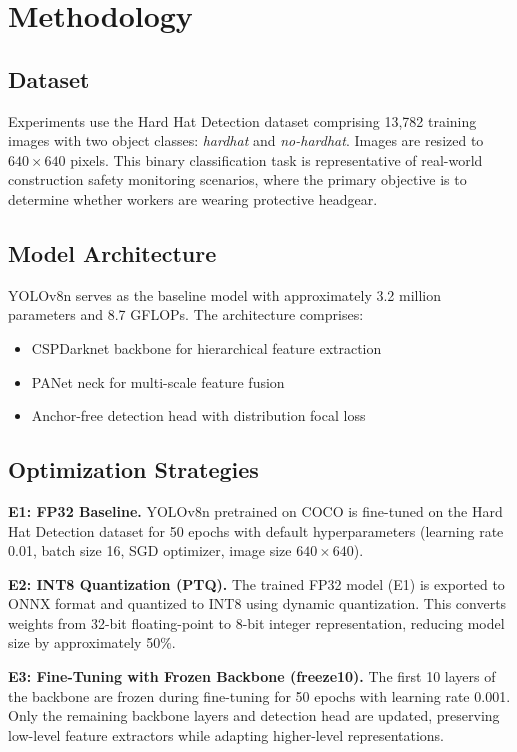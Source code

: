\documentclass[conference,a4paper]{IEEEtran}
\begin{document}
\section{Methodology}

\subsection{Dataset}

Experiments use the Hard Hat Detection dataset comprising 13,782 training images with two object classes: \textit{hardhat} and \textit{no-hardhat}. Images are resized to $640 \times 640$ pixels. This binary classification task is representative of real-world construction safety monitoring scenarios, where the primary objective is to determine whether workers are wearing protective headgear.

\subsection{Model Architecture}

YOLOv8n serves as the baseline model with approximately 3.2 million parameters and 8.7 GFLOPs. The architecture comprises:
\begin{itemize}
    \item CSPDarknet backbone for hierarchical feature extraction
    \item PANet neck for multi-scale feature fusion
    \item Anchor-free detection head with distribution focal loss
\end{itemize}

\subsection{Optimization Strategies}

\textbf{E1: FP32 Baseline.} YOLOv8n pretrained on COCO is fine-tuned on the Hard Hat Detection dataset for 50 epochs with default hyperparameters (learning rate 0.01, batch size 16, SGD optimizer, image size $640 \times 640$).

\textbf{E2: INT8 Quantization (PTQ).} The trained FP32 model (E1) is exported to ONNX format and quantized to INT8 using dynamic quantization. This converts weights from 32-bit floating-point to 8-bit integer representation, reducing model size by approximately 50\%.

\textbf{E3: Fine-Tuning with Frozen Backbone (freeze10).} The first 10 layers of the backbone are frozen during fine-tuning for 50 epochs with learning rate 0.001. Only the remaining backbone layers and detection head are updated, preserving low-level feature extractors while adapting higher-level representations.
\end{document}
